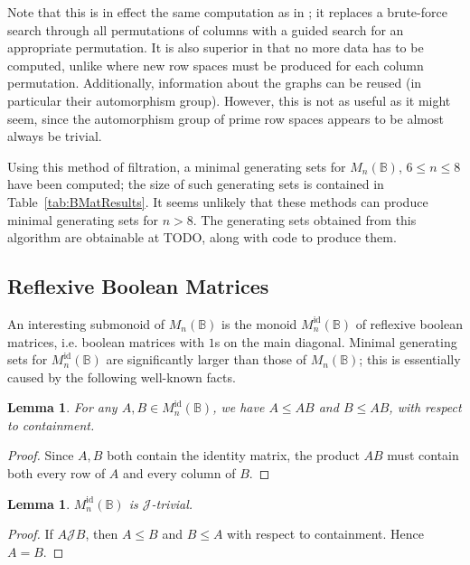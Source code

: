 \documentclass[11pt]{article}
\newtheorem{lemma}[thm]{Lemma}
\numberwithin{equation}{section}
\newcommand{\B}{\mathbb{B}}
\newcommand{\Bn}{M_n(\B)}
\newcommand{\Refn}{M_n^{\text{id}}(\B)}
\newcommand{\J}{\mathscr{J}}
\begin{document}
Note that this is in effect the same computation as in ; it
replaces a brute-force search through all permutations of columns with a guided
search for an appropriate permutation. It is also superior in that no more data
has to be computed, unlike  where new row spaces must be
produced for each column permutation. Additionally, information about the graphs
can be reused (in particular their automorphism group). However, this is not as
useful as it might seem, since the automorphism group of prime row spaces
appears to be almost always be trivial.

Using this method of filtration, a minimal generating sets for $\Bn$, $6 \leq n
\leq 8$ have been computed; the size of such generating sets is contained in
Table~\ref{tab:BMatResults}. It seems unlikely that these methods can produce
minimal generating sets for $n > 8$. The generating sets obtained from this
algorithm are obtainable at TODO, along with code to produce them.

\subsection{Reflexive Boolean Matrices}
\label{sec:RefBoolMat}
An interesting submonoid of $\Bn$ is the monoid $\Refn$ of reflexive boolean
matrices, i.e. boolean matrices with $1$s on the main diagonal. Minimal
generating sets for $\Refn$ are significantly larger than those of $\Bn$; this
is essentially caused by the following well-known facts.

\begin{lemma}
  For any $A, B \in \Refn$, we have $A \leq AB$ and $B \leq AB$, with
  respect to containment.
\end{lemma}
\begin{proof}
  Since $A, B$ both contain the identity matrix, the product $AB$ must
  contain both every row of $A$ and every column of $B$.
\end{proof}

\begin{lemma}
  $\Refn$ is $\J$-trivial. 
\end{lemma}
\begin{proof}
  If $A \J B$, then $A \leq B$ and $B \leq A$ with respect to containment. Hence
  $A = B$.    
\end{proof}
\end{document}
